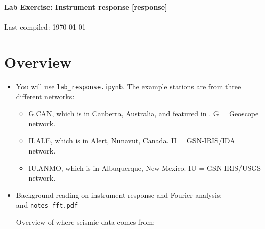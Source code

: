 \documentclass[11pt,titlepage,fleqn]{article}
\newcommand{\tfile}{{\tt lab\_response.ipynb}}
\begin{document}

\begin{spacing}{1.2}
\centering
{\large \bf Lab Exercise: Instrument response [response]} \\
\cltag\ \\
Last compiled: \today
\end{spacing}


\section{Overview}

\begin{itemize}

\item You will use \tfile. The example stations are from three different networks:
%
\begin{itemize}
\item G.CAN, which is in Canberra, Australia, and featured in \citet[][Figure~1]{Park2005}. G = Geoscope network.
\item II.ALE, which is in Alert, Nunavut, Canada. II = GSN-IRIS/IDA network.
\item IU.ANMO, which is in Albuquerque, New Mexico. IU = GSN-IRIS/USGS network.
\end{itemize}



\item Background reading on instrument response and Fourier analysis: \\ \citet[][Ch.~6]{SteinWysession} and \verb+notes_fft.pdf+

Overview of where seismic data comes from: \citet{RinglerBastien2020}





\end{itemize}
\end{document}
